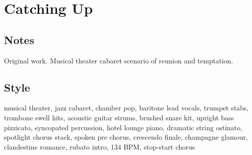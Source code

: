 \section{Catching Up}

\subsection{Notes}
Original work.
Musical theater cabaret scenario of reunion and temptation.

\subsection{Style}
musical theater, jazz cabaret, chamber pop, baritone lead vocals, trumpet stabs, trombone swell hits, acoustic guitar strums, brushed snare kit, upright bass pizzicato, syncopated percussion, hotel lounge piano, dramatic string ostinato, spotlight chorus stack, spoken pre chorus, crescendo finale, champagne glamour, clandestine romance, rubato intro, 134 BPM, stop-start chorus

